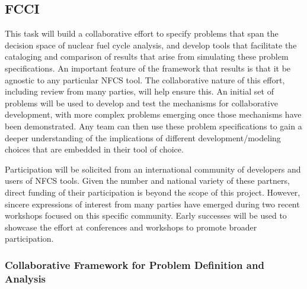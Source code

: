 
\subsection{\gls{FCCI}}

This task will build a collaborative effort to specify problems that span the
decision space of nuclear fuel cycle analysis, and develop tools that
facilitate the cataloging and comparison of results that arise from simulating
these problem specifications.  An important feature of the framework that
results is that it be agnostic to any particular \gls{NFCS} tool.  The
collaborative nature of this effort, including review from many parties, will
help ensure this.  An initial set of problems will be used to develop and test
the mechanisms for collaborative development, with more complex problems
emerging once those mechanisms have been demonstrated.  Any team can then use
these problem specifications to gain a deeper understanding of the
implications of different development/modeling choices that are embedded in
their tool of choice.

Participation will be solicited from an international community of developers
and users of \gls{NFCS} tools.  Given the number and national variety of these
partners, direct funding of their participation is beyond the scope of this
project.  However, sincere expressions of interest from many parties have
emerged during two recent workshops \cite{twofc.2015, twofc.2016} focused on this specific community.  Early
successes will be used to showcase the effort at conferences and workshops to
promote broader participation.



\subsubsection{Collaborative Framework for Problem Definition and Analysis} 

